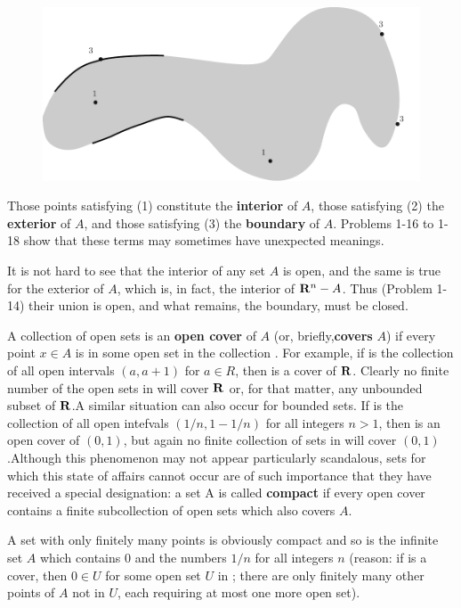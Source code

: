 \begin{figure}[!htb]
    \centering
    \includegraphics[width=.75\linewidth]{./pics/Fig1-2.pdf}
    \caption{}
    \label{Fig 1-2}
\end{figure}

Those points satisfying (1) constitute the \textbf{interior} of $A$, those
satisfying (2) the \textbf{exterior} of $A$, and those satisfying (3) the
\textbf{boundary} of $A$. Problems 1-16 to 1-18 show that these terms
may sometimes have unexpected meanings.

It is not hard to see that the interior of any set $A$ is open,
and the same is true for the exterior of $A$, which is, in fact, the
interior of $\mathbf{R}^n-A$. Thus (Problem 1-14) their union is open,
and what remains, the boundary, must be closed.

A collection  of open sets is an \textbf{open cover} of $A$ 
(or, briefly,\textbf{covers} $A$) if every point $x \in A$ is 
in some open set in the collection .
For example, if  is the collection of all open
intervals $(a, a + 1)$ for $a\in R$, then  is a cover of $\mathbf{R}$.
Clearly no finite number of the open sets in  will cover $\mathbf{R}$ or, 
for that matter, any unbounded subset of $\mathbf{R}$.A similar situation can
also occur for bounded sets. 
If  is the collection of all open
intefvals $(1/n, 1-1/n)$ for all integers $n > 1$, then  is an
open cover of $(0,1)$, but again no finite collection of sets in
 will cover $(0,1)$.Although this phenomenon may not appear
particularly scandalous, sets for which this state of affairs
cannot occur are of such importance that they have received a
special designation: a set A is called \textbf{compact} if every open
cover  contains a finite subcollection of open sets which
also covers $A$.

A set with only finitely many points is obviously compact
and so is the infinite set $A$ which contains 0 and the numbers
$1/n$ for all integers $n$ (reason: if  is a cover, then $0 \in U$ for
some open set $U$ in ; there are only finitely many other points
of $A$ not in $U$, each requiring at most one more open set).


